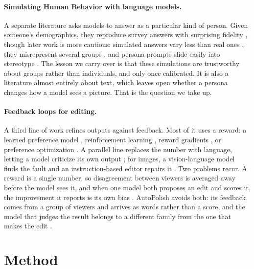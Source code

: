 \documentclass[10pt,twocolumn,letterpaper]{article}
\begin{document}
\paragraph{Simulating Human Behavior with language models.} A separate literature asks models to answer as a particular kind of person. Given someone's demographics, they reproduce survey answers with surprising fidelity \citep{argyle2023}, though later work is more cautious: simulated answers vary less than real ones \citep{bisbee2024synthetic}, they misrepresent several groups \citep{santurkar2023whose}, and persona prompts slide easily into stereotype \citep{cheng2023compost}. The lesson we carry over is that these simulations are trustworthy about groups rather than individuals, and only once calibrated. It is also a literature almost entirely about text, which leaves open whether a persona changes how a model sees a picture. That is the question we take up.

\paragraph{Feedback loops for editing.} A third line of work refines outputs against feedback. Most of it uses a reward: a learned preference model \citep{xu2023imagereward, kirstain2023pickapic}, reinforcement learning \citep{fan2023dpok, black2024ddpo}, reward gradients \citep{clark2024draft, prabhudesai2023alignprop}, or preference optimization \citep{wallace2024dpo}. A parallel line replaces the number with language, letting a model criticize its own output \citep{madaan2023selfrefine, shinn2023reflexion, gou2024critic}; for images, a vision-language model finds the fault and an instruction-based editor repairs it \citep{wu2024sld, wang2024genartist, brooks2023instructpix2pix, flux2024}. Two problems recur. A reward is a single number, so disagreement between viewers is averaged away before the model sees it, and when one model both proposes an edit and scores it, the improvement it reports is its own bias \citep{xu2024selfbias}. AutoPolish avoids both: its feedback comes from a group of viewers and arrives as words rather than a score, and the model that judges the result belongs to a different family from the one that makes the edit \citep{schuhmann2022, oquab2023}.

\section{Method}
\end{document}
